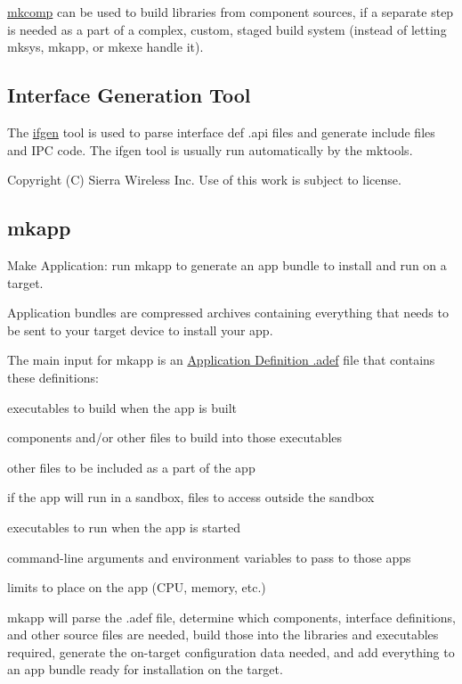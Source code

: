 \hyperlink{buildToolsmkcomp}{mkcomp} can be used to build libraries from component sources, if a separate step is needed as a part of a complex, custom, staged build system (instead of letting mksys, mkapp, or mkexe handle it).

\subsection*{Interface Generation Tool}

The \hyperlink{buildToolsifgen}{ifgen} tool is used to parse interface def .api files and generate include files and I\+P\+C code. The {\ttfamily ifgen} tool is usually run automatically by the {\ttfamily mktools}.



 Copyright (C) Sierra Wireless Inc. Use of this work is subject to license. \hypertarget{buildToolsmkapp}{}\subsection{mkapp}\label{buildToolsmkapp}
Make Application\+: run {\ttfamily mkapp} to generate an app bundle to install and run on a target.

Application bundles are compressed archives containing everything that needs to be sent to your target device to install your app.

The main input for {\ttfamily mkapp} is an \hyperlink{defFilesAdef}{Application Definition .adef} file that contains these definitions\+:


\begin{DoxyItemize}
\item executables to build when the app is built
\item components and/or other files to build into those executables
\item other files to be included as a part of the app
\item if the app will run in a sandbox, files to access outside the sandbox
\item executables to run when the app is started
\item command-\/line arguments and environment variables to pass to those apps
\item limits to place on the app (C\+P\+U, memory, etc.)
\end{DoxyItemize}

{\ttfamily mkapp} will parse the .adef file, determine which components, interface definitions, and other source files are needed, build those into the libraries and executables required, generate the on-\/target configuration data needed, and add everything to an app bundle ready for installation on the target.

